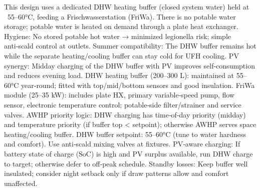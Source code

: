 \markdownRendererDocumentBegin
\markdownRendererSectionBegin
{}\markdownRendererInterblockSeparator
{}This design uses a dedicated DHW heating buffer (closed system water) held at ~55–60°C, feeding a Frischwasserstation (FriWa). There is no potable water storage; potable water is heated on demand through a plate heat exchanger.\markdownRendererInterblockSeparator
{}\markdownRendererSectionBegin
{}\markdownRendererInterblockSeparator
{}\markdownRendererUlBeginTight
\markdownRendererUlItem Hygiene: No stored potable hot water → minimized legionella risk; simple anti‑scald control at outlets.\markdownRendererUlItemEnd 
\markdownRendererUlItem Summer compatibility: The DHW buffer remains hot while the separate heating/cooling buffer can stay cold for UFH cooling.\markdownRendererUlItemEnd 
\markdownRendererUlItem PV synergy: Midday charging of the DHW buffer with PV improves self‑consumption and reduces evening load.\markdownRendererUlItemEnd 
\markdownRendererUlEndTight \markdownRendererInterblockSeparator
{}
\markdownRendererSectionEnd \markdownRendererSectionBegin
{}\markdownRendererInterblockSeparator
{}\markdownRendererUlBeginTight
\markdownRendererUlItem DHW heating buffer (200–300 L): maintained at 55–60°C year‑round; fitted with top/mid/bottom sensors and good insulation.\markdownRendererUlItemEnd 
\markdownRendererUlItem FriWa module (25–35 kW): includes plate HX, primary variable‑speed pump, flow sensor, electronic temperature control; potable‑side filter/strainer and service valves.\markdownRendererUlItemEnd 
\markdownRendererUlItem AWHP priority logic: DHW charging has time‑of‑day priority (midday) and temperature priority (if buffer top < setpoint); otherwise AWHP serves space heating/cooling buffer.\markdownRendererUlItemEnd 
\markdownRendererUlEndTight \markdownRendererInterblockSeparator
{}
\markdownRendererSectionEnd \markdownRendererSectionBegin
{}\markdownRendererInterblockSeparator
{}\markdownRendererUlBeginTight
\markdownRendererUlItem DHW buffer setpoint: 55–60°C (tune to water hardness and comfort). Use anti‑scald mixing valves at fixtures.\markdownRendererUlItemEnd 
\markdownRendererUlItem PV‑aware charging: If battery state of charge (SoC) is high and PV surplus available, run DHW charge to target; otherwise defer to off‑peak schedule.\markdownRendererUlItemEnd 
\markdownRendererUlItem Standby losses: Keep buffer well insulated; consider night setback only if draw patterns allow and comfort unaffected.\markdownRendererUlItemEnd 
